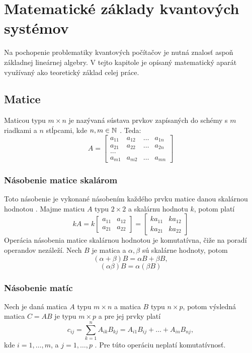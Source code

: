 
\chapter{Matematické základy kvantových systémov}

Na pochopenie problematiky kvantových počítačov je nutná znalosť aspoň základnej lineárnej algebry.
V tejto kapitole je opísaný matematický aparát využívaný ako teoretický základ celej práce.

\section{Matice}

Maticou typu \(m \times n\) je nazývaná sústava prvkov zapísaných do schémy s \(m\) riadkami a \(n\) stĺpcami, kde \(n,m \in \mathbb{N}\) \cite{Ste18}.
Teda:
\[
A = \begin{bmatrix}
		a_{11} & a_{12} & \dots & a_{1n} \\
		a_{21} & a_{22} & \dots & a_{2n} \\
		{...}							\\
		a_{m1} & a_{m2} & \dots & a_{mn}
     \end{bmatrix}
\]

\subsection{Násobenie matice skalárom}
Toto násobenie je vykonané násobením každého prvku matice danou skalárnou hodnotou \cite{Ste18}.
Majme maticu \(A\) typu \(2 \times 2\) a skalárnu hodnotu \(k\), potom platí
\[
kA = k \begin{bmatrix}
		 a_{11} & a_{12} \\
		 a_{21} & a_{22}
       \end{bmatrix}
= \begin{bmatrix}
	ka_{11} & ka_{12} \\
	ka_{21} & ka_{22}
  \end{bmatrix}
\]
Operácia násobenia matice skalárnou hodnotou je komutatívna, čiže na poradí operandov nezáleží.
Nech \(B\) je matica a \(\alpha, \beta\) sú skalárne hodnoty, potom
\[(\alpha + \beta)B = \alpha B + \beta B,\] \[(\alpha \beta)B = \alpha(\beta B)\]

\subsection{Násobenie matíc}
Nech je daná matica \(A\) typu \(m \times n\) a matica \(B\) typu \(n \times p\), potom výsledná matica \(C = AB\) je typu \(m \times p\) a pre jej prvky platí
\[c_{ij} = \sum_{k=1}^{n} A_{ik}B_{kj} = A_{i1}B_{ij} + \dots + A_{in}B_{nj},\]
kde \(i = 1, \dots ,m\), a \(j = 1, \dots , p\) \cite{Ste18}.
Pre túto operáciu neplatí komutatívnosť.

